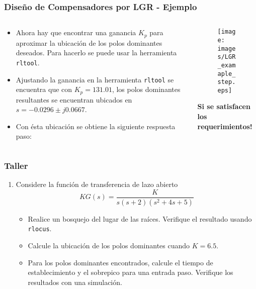 \documentclass[aspectratio=169,handout]{beamer}
\theoremstyle{definition}
\theoremstyle{plain}
\theoremstyle{remark}
\newcounter{saveenumi}
\newcommand{\seti}{\setcounter{saveenumi}{\value{enumi}}}
\begin{document}
\begin{frame}[c]\frametitle{Diseño de Compensadores por LGR - Ejemplo}
\begin{columns}
	\begin{column}{0.5\textwidth}
	\small
	\begin{itemize}
		\item Ahora hay que encontrar una ganancia $K_p$ para aproximar la ubicación de los polos dominantes deseados. Para hacerlo se puede usar la herramienta \texttt{rltool}.
		\item Ajustando la ganancia en la herramienta \texttt{rltool} se encuentra que con $K_p = 131.01$, los polos dominantes resultantes se encuentran ubicados en $s = -0.0296 \pm j0.0667$.
		\item Con ésta ubicación se obtiene la siguiente respuesta paso:
	\end{itemize}	
	\end{column}
	\begin{column}{0.5\textwidth}
	\small
	\begin{figure}
		\texttt{[image: images/LGR\_examaple\_step.eps]}
	\end{figure}
	\centering
	\textbf{Si se satisfacen los requerimientos!}
	\end{column}
\end{columns}
\end{frame}

\begin{frame}[c]\frametitle{Taller}
\begin{enumerate}
	\item Considere la función de transferencia de lazo abierto
	\begin{equation*}
		KG(s) = \frac{K}{s(s+2)(s^2+4s+5)}
	\end{equation*}
	\begin{itemize}
		\item Realice un bosquejo del lugar de las raíces. Verifique el resultado usando \texttt{rlocus}.
		\item Calcule la ubicación de los polos dominantes cuando $K = 6.5$.
		\item Para los polos dominantes encontrados, calcule el tiempo de establecimiento y el sobrepico para una entrada paso. Verifique los resultados con una simulación.
	\end{itemize}
	\seti
\end{enumerate}
\end{frame}
\end{document}
